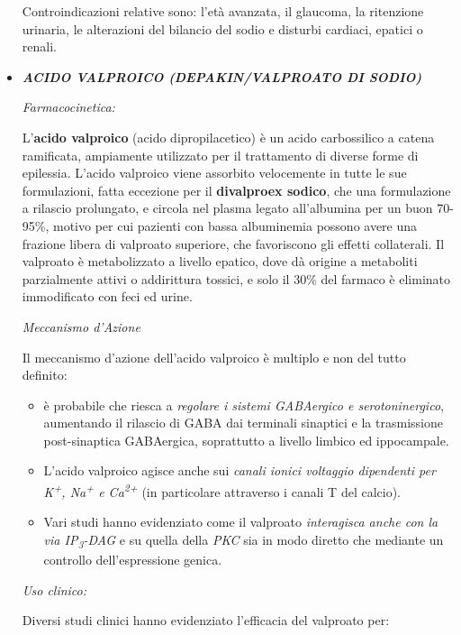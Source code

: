 \begin{itemize}
Controindicazioni relative sono: l'età avanzata, il glaucoma, la
ritenzione urinaria, le alterazioni del bilancio del sodio e disturbi
cardiaci, epatici o renali.

\item
  \textbf{\emph{ACIDO VALPROICO (DEPAKIN/VALPROATO DI SODIO)}}

\emph{\emph{Farmacocinetica:}}

L'\textbf{acido valproico} (acido dipropilacetico) è un acido
carbossilico a catena ramificata, ampiamente utilizzato per il
trattamento di diverse forme di epilessia. L'acido valproico viene
assorbito velocemente in tutte le sue formulazioni, fatta eccezione per
il \textbf{divalproex sodico}, che una formulazione a rilascio
prolungato, e circola nel plasma legato all'albumina per un buon
70-95\%, motivo per cui pazienti con bassa albuminemia possono avere una
frazione libera di valproato superiore, che favoriscono gli effetti
collaterali. Il valproato è metabolizzato a livello epatico, dove dà
origine a metaboliti parzialmente attivi o addirittura tossici, e solo
il 30\% del farmaco è eliminato immodificato con feci ed urine.

\emph{\emph{Meccanismo d'Azione}}

Il meccanismo d'azione dell'acido valproico è multiplo e non del tutto
definito:

\begin{itemize}
\item
  è probabile che riesca a \emph{regolare i sistemi GABAergico e
  serotoninergico}, aumentando il rilascio di GABA dai terminali
  sinaptici e la trasmissione post-sinaptica GABAergica, soprattutto a
  livello limbico ed ippocampale.
\item
  L'acido valproico agisce anche sui \emph{canali ionici voltaggio
  dipendenti per K\textsuperscript{+}, Na\textsuperscript{+} e
  Ca\textsuperscript{2+}} (in particolare attraverso i canali T del
  calcio).
\item
  Vari studi hanno evidenziato come il valproato \emph{interagisca anche
  con la via IP\textsubscript{3}-DAG} e su quella della \emph{PKC} sia
  in modo diretto che mediante un controllo dell'espressione genica.
\end{itemize}

\emph{\emph{Uso clinico:}}

Diversi studi clinici hanno evidenziato l'efficacia del valproato per:


\end{itemize}
